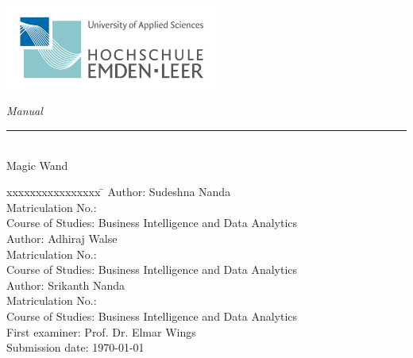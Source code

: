 %
% 
%

\begin{titlepage}
    
    \begin{flushleft} 
        \includegraphics[width=7cm]{General/Logo.png}
    \end{flushleft} 
    
    \begin{flushright}
        \vspace{2cm}
        \LARGE \textsl{Manual}\\
        \rule{0.6\textwidth}{0.4pt} ~\\
        \vspace{0.5cm}
        \textsf{\LARGE Magic Wand }\\
    \end{flushright}
    
    \vspace{1cm}
    \large
    \begin{tabbing}
    	xxxxxxxxxxxxxxxx \= \kill
    	Author: \> Sudeshna Nanda \\
    	Matriculation No.:  \\
    	Course of Studies: \> Business Intelligence and Data Analytics \\ [0.5cm]
    	
    	Author: \> Adhiraj Walse \\
    	Matriculation No.:  \\
    	Course of Studies: \> Business Intelligence and Data Analytics \\ [0.5cm]
    	
    	Author: \> Srikanth Nanda \\
    	Matriculation No.:  \\
    	Course of Studies: \> Business Intelligence and Data Analytics \\ [0.5cm]
    	
    	First examiner: \> Prof. Dr. Elmar Wings \\
    	Submission date: \> \today \\
    \end{tabbing}
    

\end{titlepage}

